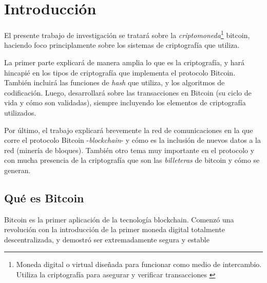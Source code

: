 







\clearpage
\tableofcontents
\clearpage 

\lstset{style=pythonstyle}

\section{Introducción}

El presente trabajo de investigación se tratará sobre la \emph{criptomoneda}\footnote{Moneda digital o virtual diseñada para funcionar como medio de intercambio. Utiliza la criptografía para asegurar y verificar transacciones \autocite{CointelegraphBitcoin}} bitcoin, haciendo foco principlamente sobre los sistemas de criptografía que utiliza. 

La primer parte explicará de manera amplia lo que es la criptografía, y hará hincapié en los tipos de criptografía que implementa el protocolo Bitcoin. También incluirá las funciones de \emph{hash} que utiliza, y los algoritmos de codificación. Luego, desarrollará sobre las transacciones en Bitcoin (su ciclo de vida y cómo son validadas), siempre incluyendo los elementos de criptografía utilizados.

Por último, el trabajo explicará brevemente la red de comunicaciones en la que corre el protocolo Bitcoin -\emph{blockchain}- y cómo es la inclusión de nuevos datos a la red (minería de bloques). También otro tema muy importante en el protocolo y con mucha presencia de la criptografía que son las \emph{billeteras} de bitcoin y cómo se generan. 

\subsection{Qué es Bitcoin}

Bitcoin es la primer aplicación de la tecnología blockchain. Comenzó una revolución con la introducción de la primer moneda digital totalmente descentralizada, y demostró ser extremadamente segura y estable \autocite{MasteringBlockchainBitcoin}

